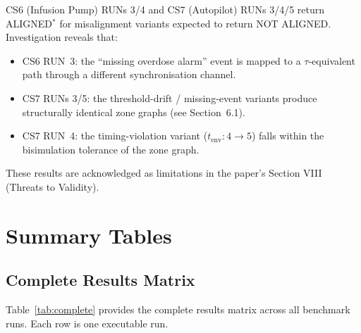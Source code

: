 \documentclass[10pt,a4paper]{article}
\newcommand{\WARN}[1]{\textcolor{warnred}{#1}}
\begin{document}
CS6 (Infusion Pump) RUNs 3/4 and CS7 (Autopilot) RUNs 3/4/5 return
\WARN{ALIGNED${}^*$} for misalignment variants expected to return
NOT ALIGNED. Investigation reveals that:
\begin{itemize}
  \item CS6 RUN~3: the ``missing overdose alarm'' event is mapped to a
        $\tau$-equivalent path through a different synchronisation channel.
  \item CS7 RUNs 3/5: the threshold-drift / missing-event variants produce
        structurally identical zone graphs (see Section~6.1).
  \item CS7 RUN~4: the timing-violation variant ($t_\text{env}: 4 \to 5$)
        falls within the bisimulation tolerance of the zone graph.
\end{itemize}
These results are acknowledged as limitations in the paper's Section VIII
(Threats to Validity).

\section{Summary Tables}

\subsection{Complete Results Matrix}

Table~\ref{tab:complete} provides the complete results matrix across all
benchmark runs. Each row is one executable run.
\end{document}
